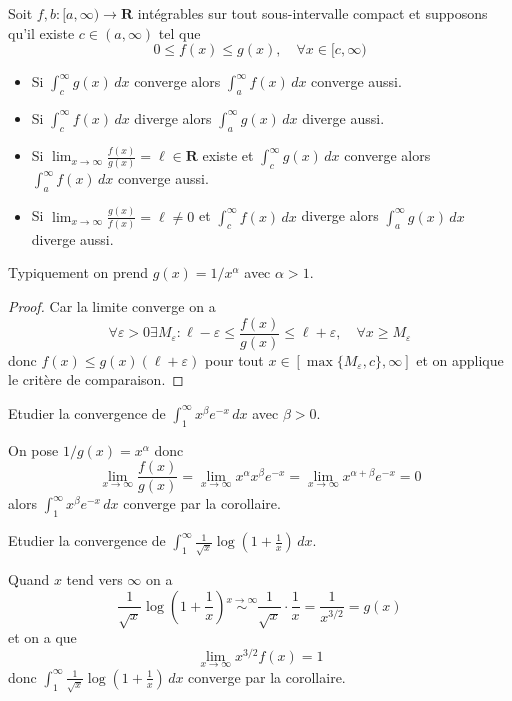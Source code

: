 \begin{lemma}
Soit $f,b:[a,\infty)\to \mathbf{R}$ intégrables sur tout sous-intervalle compact et supposons qu'il existe $c\in(a,\infty)$ tel que 
$$
0\leq f(x)\leq g(x),\quad\forall x \in[c,\infty)
$$
\begin{itemize}
\item Si $\int_{c}^{\infty} g(x) \, dx$ converge alors $\int_{a}^{\infty} f(x) \, dx$ converge aussi.
\item Si $\int_{c}^{\infty} f(x) \, dx$ diverge alors $\int_{a}^{\infty} g(x) \, dx$ diverge aussi.
\end{itemize}
\end{lemma}
\begin{corollary}
\begin{itemize}
	\item Si $\lim_{ x \to \infty } \frac{f(x)}{g(x)}=\ell \in\mathbf{R}$ existe et $\int_{c}^{\infty} g(x) \, dx$ converge alors $\int_{a}^{\infty} f(x) \, dx$ converge aussi.
	\item Si $\lim_{ x \to \infty } \frac{g(x)}{f(x)}=\ell\neq0$ et $\int_{c}^{\infty} f(x) \, dx$ diverge alors $\int_{a}^{\infty} g(x) \, dx$ diverge aussi.
\end{itemize}
\end{corollary}
\begin{remark}
Typiquement on prend $g(x)=1/x^{\alpha}$ avec $\alpha>1$.
\end{remark}
\begin{proof}
Car la limite converge on a
$$
\forall\varepsilon>0\exists M_{\varepsilon}: \ell -\varepsilon\leq \frac{f(x)}{g(x)}\leq \ell+\varepsilon,\quad\forall x\geq M_{\varepsilon}
$$
donc $f(x)\leq g(x)(\ell+\varepsilon)$ pour tout $x \in [\max\{ M_{\varepsilon},c \},\infty]$ et on applique le critère de comparaison.
\end{proof}
\begin{example}
Etudier la convergence de $\int_{1}^{\infty} x^{\beta}e^{-x} \, dx$ avec $\beta>0$.

On pose $1/g(x)=x^{\alpha}$ donc
$$
\lim_{ x \to \infty } \frac{f(x)}{g(x)}=\lim_{ x \to \infty } x^{\alpha}x^{\beta}e^{ -x }=\lim_{ x \to \infty } x^{\alpha+\beta}e^{ -x }=0
$$
alors $\int_{1}^{\infty} x^{\beta}e^{ -x } \, dx$ converge par la corollaire. 
\end{example}
\begin{example}
Etudier la convergence de $\int_{1}^{\infty} \frac{1}{\sqrt{ x }}\log\left( 1+\frac{1}{x} \right) \, dx$.

Quand $x$ tend vers $\infty$ on a
$$
\frac{1}{\sqrt{ x }}\log\left( 1+\frac{1}{x} \right)\overset{x\to \infty}\sim \frac{1}{\sqrt{ x }}\cdot \frac{1}{x}=\frac{1}{x^{3/2}}=g(x)
$$
et on a que 
$$
\lim_{ x \to \infty } x^{3/2}f(x)=1
$$
donc $\int_{1}^{\infty} \frac{1}{\sqrt{ x }}\log\left( 1+\frac{1}{x} \right) \, dx$ converge par la corollaire.
\end{example}
